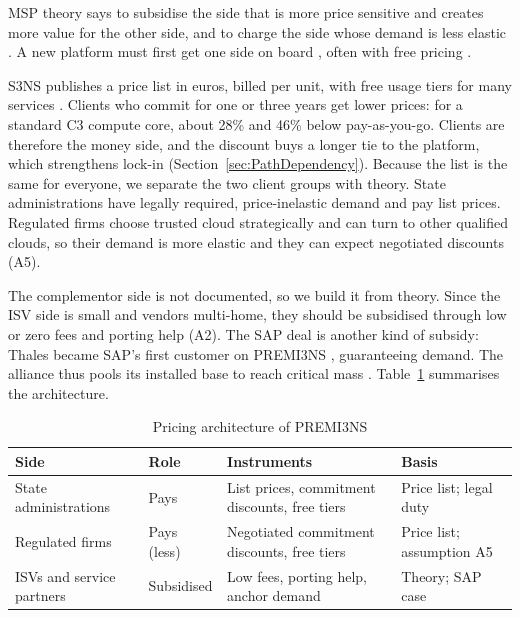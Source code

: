 MSP theory says to subsidise the side that is more price sensitive and creates more value for the other side, and to charge the side whose demand is less elastic \parencite{rochet2006, parker2005}. A new platform must first get one side on board \parencite{caillaud2003}, often with free pricing \parencite[slide 3]{windekilde2026msp}.

S3NS publishes a price list in euros, billed per unit, with free usage tiers for many services \parencite{s3nsprices}. Clients who commit for one or three years get lower prices: for a standard C3 compute core, about 28\% and 46\% below pay-as-you-go. Clients are therefore the money side, and the discount buys a longer tie to the platform, which strengthens lock-in (Section~\ref{sec:PathDependency}). Because the list is the same for everyone, we separate the two client groups with theory. State administrations have legally required, price-inelastic demand and pay list prices. Regulated firms choose trusted cloud strategically and can turn to other qualified clouds, so their demand is more elastic and they can expect negotiated discounts (A5).

The complementor side is not documented, so we build it from theory. Since the ISV side is small \parencite{futurum2026} and vendors multi-home, they should be subsidised through low or zero fees and porting help (A2). The SAP deal is another kind of subsidy: Thales became SAP's first customer on PREMI3NS \parencite{thalessap2026}, guaranteeing demand. The alliance thus pools its installed base to reach critical mass \parencite[slide 38]{windekilde2026msp}. Table~\ref{tab:pricing} summarises the architecture.

\begin{table}[htbp]
\centering
\begin{tabular}{|>{\raggedright\arraybackslash}p{2.6cm}|>{\raggedright\arraybackslash}p{2.2cm}|>{\raggedright\arraybackslash}p{4.6cm}|>{\raggedright\arraybackslash}p{3.6cm}|}
\hline
\textbf{Side} & \textbf{Role} & \textbf{Instruments} & \textbf{Basis} \\ \hline
State administrations & Pays & List prices, commitment discounts, free tiers & Price list; legal duty \\ \hline
Regulated firms & Pays (less) & Negotiated commitment discounts, free tiers & Price list; assumption A5 \\ \hline
ISVs and service partners & Subsidised & Low fees, porting help, anchor demand & Theory; SAP case \\ \hline
\end{tabular}
\caption{Pricing architecture of PREMI3NS}
\label{tab:pricing}
\end{table}

